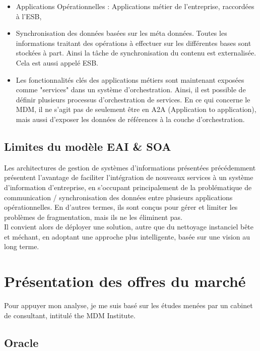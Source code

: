 \begin{itemize}

\item Applications Opérationnelles : Applications métier de l'entreprise, raccordées à l'ESB, 

\item Synchronisation des données basées sur les méta données. Toutes les informations traitant  des opérations à effectuer sur les différentes bases sont stockées à part. Ainsi la tâche de synchronisation du contenu est externalisée. Cela est aussi appelé ESB.

\item Les fonctionnalités clés des applications métiers sont maintenant exposées  comme "services" dans un système d'orchestration. Ainsi, il est possible de définir plusieurs processus d'orchestration de services. En ce qui concerne le MDM, il ne s'agit pas de seulement être en A2A (Application to application), mais aussi d'exposer les données de références à la couche d'orchestration.

\end{itemize}

\subsection{Limites du modèle EAI \& SOA}

Les architectures de gestion de systèmes d'informations présentées précédemment présentent l'avantage de faciliter l'intégration de nouveaux services à un système d'information d'entreprise, en s'occupant principalement de la problématique de communication / synchronisation des données entre plusieurs applications opérationnelles. En d'autres termes, ils sont conçus pour gérer et limiter les problèmes de fragmentation, mais ils ne les éliminent pas.\\
Il convient alors de déployer une solution, autre que du nettoyage instanciel bête et méchant, en adoptant une approche plus intelligente, basée sur une vision au long terme. 

\section{Présentation des offres du marché}

Pour appuyer mon analyse, je me suis basé sur les études menées par un cabinet de consultant, intitulé the MDM Institute.

\subsection{Oracle}

